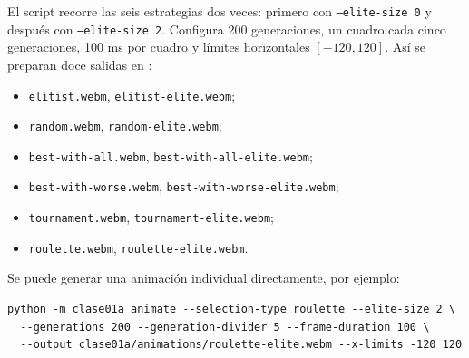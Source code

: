 \documentclass[12pt,a4paper]{article}
\begin{document}
El script  recorre las seis estrategias dos veces:
primero con \texttt{--elite-size 0} y después con \texttt{--elite-size 2}.
Configura 200 generaciones, un cuadro cada cinco generaciones, 100 ms por
cuadro y límites horizontales \([-120,120]\). Así se preparan doce salidas en
:

\begin{itemize}
  \item \texttt{elitist.webm}, \texttt{elitist-elite.webm};
  \item \texttt{random.webm}, \texttt{random-elite.webm};
  \item \texttt{best-with-all.webm}, \texttt{best-with-all-elite.webm};
  \item \texttt{best-with-worse.webm}, \texttt{best-with-worse-elite.webm};
  \item \texttt{tournament.webm}, \texttt{tournament-elite.webm};
  \item \texttt{roulette.webm}, \texttt{roulette-elite.webm}.
\end{itemize}

Se puede generar una animación individual directamente, por ejemplo:

\begin{verbatim}
python -m clase01a animate --selection-type roulette --elite-size 2 \
  --generations 200 --generation-divider 5 --frame-duration 100 \
  --output clase01a/animations/roulette-elite.webm --x-limits -120 120
\end{verbatim}
\end{document}
